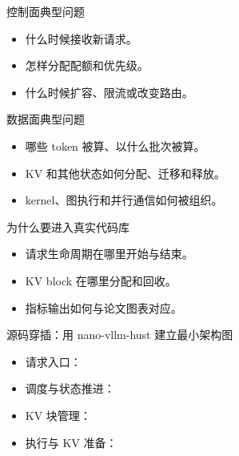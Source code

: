 \begin{frame}{控制面典型问题}
  \begin{itemize}
    \item 什么时候接收新请求。
    \item 怎样分配配额和优先级。
    \item 什么时候扩容、限流或改变路由。
  \end{itemize}
\end{frame}

\begin{frame}{数据面典型问题}
  \begin{itemize}
    \item 哪些 token 被算、以什么批次被算。
    \item KV 和其他状态如何分配、迁移和释放。
    \item kernel、图执行和并行通信如何被组织。
  \end{itemize}
\end{frame}

\begin{frame}{为什么要进入真实代码库}
  \begin{itemize}
    \item 请求生命周期在哪里开始与结束。
    \item KV block 在哪里分配和回收。
    \item 指标输出如何与论文图表对应。
  \end{itemize}
\end{frame}

\begin{frame}{源码穿插：用 nano-vllm-hust 建立最小架构图}
  \begin{itemize}
    \item 请求入口：\texttt{}
    \item 调度与状态推进：\texttt{}
    \item KV 块管理：\texttt{}
    \item 执行与 KV 准备：\texttt{}
  \end{itemize}
\end{frame}

